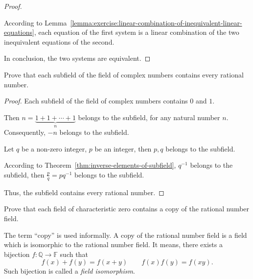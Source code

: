 \begin{proof}
\begin{enumerate}[label = \textbf{Case \arabic*.}, itemindent=1cm]
\begin{itemize}
                        According to Lemma~\ref{lemma:exercise:linear-combination-of-inequivalent-linear-equations}, each equation of the first system is a linear combination of the two inequivalent equations of the second.
              \end{itemize}
    \end{enumerate}

    In conclusion, the two systems are equivalent.
\end{proof}

\begin{exercise}
    Prove that each subfield of the field of complex numbers contains every rational number.
\end{exercise}

\begin{proof}
    Each subfield of the field of complex numbers contains $0$ and $1$.

    Then $n = \underbrace{1 + 1 + \cdots + 1}_{n}$ belongs to the subfield, for any natural number $n$. Consequently, $-n$ belongs to the subfield.

    Let $q$ be a non-zero integer, $p$ be an integer, then $p, q$ belongs to the subfield.

    According to Theorem~\ref{thm:inverse-elements-of-subfield}, $q^{-1}$ belongs to the subfield, then $\frac{p}{q} = pq^{-1}$ belongs to the subfield.

    Thus, the subfield contains every rational number.
\end{proof}

\begin{exercise}
    Prove that each field of characteristic zero contains a copy of the rational number field.
\end{exercise}

\begin{note}
    The term ``copy'' is used informally. A copy of the rational number field is a field which is isomorphic to the rational number field. It means, there exists a bijection $f: \mathbb{Q}\to\mathbb{F}$ such that
    \[
        f(x) + f(y) = f(x + y)\qquad f(x)f(y) = f(xy).
    \]
    Such bijection is called a \textit{field isomorphism}.
\end{note}

